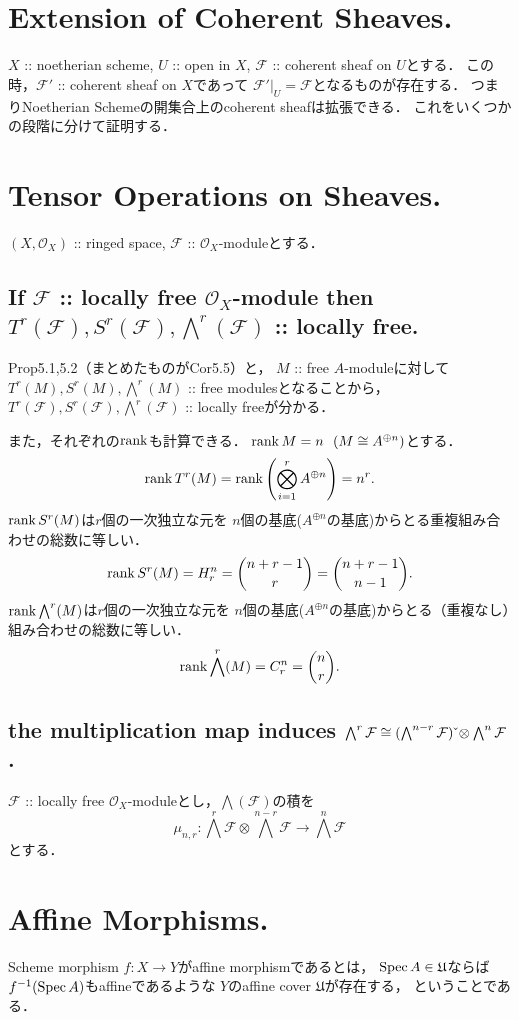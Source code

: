 \documentclass[a4paper]{jsarticle}
\newcommand{\shF}{\mathcal{F}}
\newcommand{\shO}{\mathcal{O}}
\newcommand{\coverU}{\mathfrak{U}}
\newcommand{\sidecheck}{\,\check{}}
\begin{document}
\section{Extension of Coherent Sheaves.} %
    $X$ :: noetherian scheme, $U$ :: open in $X$, 
    $\shF$ :: coherent sheaf on $U$とする．
    この時，$\shF'$ :: coherent sheaf on $X$であって
    $\shF'|_U=\shF$となるものが存在する．
    つまりNoetherian Schemeの開集合上のcoherent sheafは拡張できる．
    これをいくつかの段階に分けて証明する．

\section{Tensor Operations on Sheaves.} %
    $(X, \shO_X)$ :: ringed space, $\shF$ :: $\shO_X$-moduleとする．

    \subsection{If $\shF$ :: locally free $\shO_X$-module then 
        $T^r(\shF), S^r(\shF), \bigwedge^r(\shF)$ :: locally free.}
    Prop5.1,5.2（まとめたものがCor5.5）と，
    $M$ :: free $A$-moduleに対して
    $T^r(M), S^r(M), \bigwedge^r(M)$ :: free modulesとなることから，
    $T^r(\shF), S^r(\shF), \bigwedge^r(\shF)$ :: locally freeが分かる．

    また，それぞれの$\operatorname{rank}$も計算できる．
    $\operatorname{rank} M=n ~~(M \cong A^{\oplus n})$とする．
    \[ \operatorname{rank} T^r(M)=\operatorname{rank} \left(\bigotimes_{i=1}^r A^{\oplus n} \right)=n^r. \]
    $\operatorname{rank} S^r(M)$は$r$個の一次独立な元を
    $n$個の基底($A^{\oplus n}$の基底)からとる重複組み合わせの総数に等しい．
    \[ \operatorname{rank} S^r(M)=H_r^n=\binom{n+r-1}{r}=\binom{n+r-1}{n-1}. \]
    $\operatorname{rank} \bigwedge^r(M)$は$r$個の一次独立な元を
    $n$個の基底($A^{\oplus n}$の基底)からとる（重複なし）組み合わせの総数に等しい．
    \[ \operatorname{rank} \bigwedge^r(M)=C_r^n=\binom{n}{r}. \]

    \subsection{the multiplication map induces
        $\bigwedge^r \shF \iso (\bigwedge^{n-r} \shF)\sidecheck \otimes \bigwedge^n \shF$.}
    $\shF$ :: locally free $\shO_X$-moduleとし，$\bigwedge(\shF)$の積を
    \[ \mu_{n,r}: \bigwedge^r \shF \otimes \bigwedge^{n-r} \shF \to \bigwedge^n \shF \]
    とする．

\section{Affine Morphisms.} %
    Scheme morphism $f: X \to Y$がaffine morphismであるとは，
    $\Spec A \in \coverU$ならば$f^{-1}(\operatorname{Spec} A)$もaffineであるような
    $Y$のaffine cover $\coverU$が存在する，
    ということである．
\end{document}

